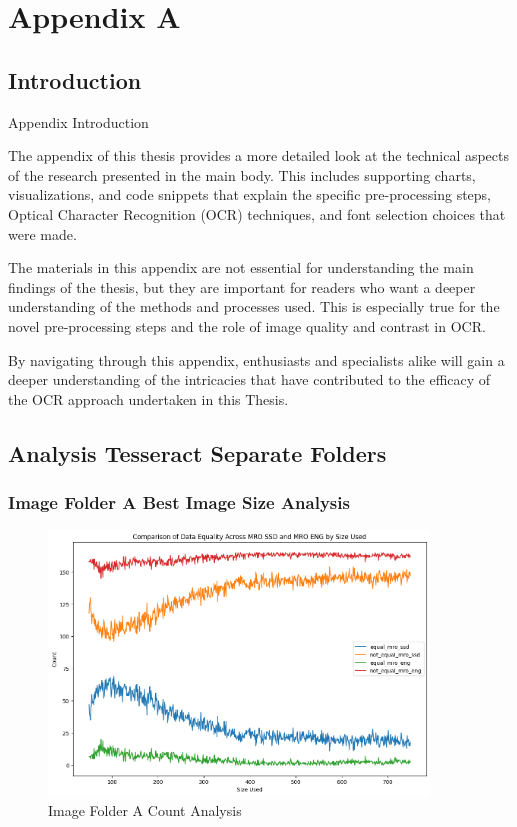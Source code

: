 \chapter{Appendix A}

\section{Introduction}

Appendix Introduction

The appendix of this thesis provides a more detailed look at the technical aspects of the research presented in the main body. This includes supporting charts, visualizations, and code snippets that explain the specific pre-processing steps, Optical Character Recognition (OCR) techniques, and font selection choices that were made.

The materials in this appendix are not essential for understanding the main findings of the thesis, but they are important for readers who want a deeper understanding of the methods and processes used. This is especially true for the novel pre-processing steps and the role of image quality and contrast in OCR.

By navigating through this appendix, enthusiasts and specialists alike will gain a deeper understanding of the intricacies that have contributed to the efficacy of the OCR approach undertaken in this Thesis.

\newpage

\section{Analysis Tesseract Separate Folders}

\subsection{Image Folder A Best Image Size Analysis}

\begin{figure}[ht]
    \centering
    \includegraphics[width=0.9\textwidth]{Figures/Results/sipa_02/count_analysis.png}
    \caption[Count Analysis]{Image Folder A Count Analysis}
    \label{fig:Image Folder A Best Image Size Analysis}
\end{figure}

